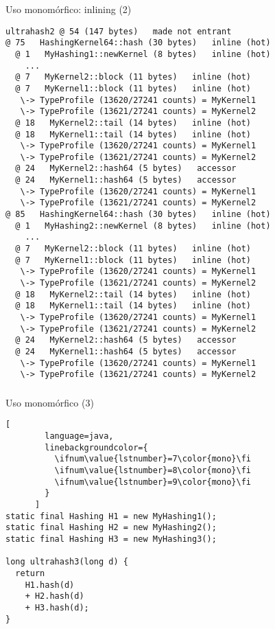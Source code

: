 \begin{frame}[fragile]
  \begin{block}{Uso monomórfico: inlining (2)}
    \begin{lstlisting}[basicstyle=\tiny]
ultrahash2 @ 54 (147 bytes)   made not entrant
@ 75   HashingKernel64::hash (30 bytes)   inline (hot)
  @ 1   MyHashing1::newKernel (8 bytes)   inline (hot)
    ...
  @ 7   MyKernel2::block (11 bytes)   inline (hot)
  @ 7   MyKernel1::block (11 bytes)   inline (hot)
   \-> TypeProfile (13620/27241 counts) = MyKernel1
   \-> TypeProfile (13621/27241 counts) = MyKernel2
  @ 18   MyKernel2::tail (14 bytes)   inline (hot)
  @ 18   MyKernel1::tail (14 bytes)   inline (hot)
   \-> TypeProfile (13620/27241 counts) = MyKernel1
   \-> TypeProfile (13621/27241 counts) = MyKernel2
  @ 24   MyKernel2::hash64 (5 bytes)   accessor
  @ 24   MyKernel1::hash64 (5 bytes)   accessor
   \-> TypeProfile (13620/27241 counts) = MyKernel1
   \-> TypeProfile (13621/27241 counts) = MyKernel2
@ 85   HashingKernel64::hash (30 bytes)   inline (hot)
  @ 1   MyHashing2::newKernel (8 bytes)   inline (hot)
    ...
  @ 7   MyKernel2::block (11 bytes)   inline (hot)
  @ 7   MyKernel1::block (11 bytes)   inline (hot)
   \-> TypeProfile (13620/27241 counts) = MyKernel1
   \-> TypeProfile (13621/27241 counts) = MyKernel2
  @ 18   MyKernel2::tail (14 bytes)   inline (hot)
  @ 18   MyKernel1::tail (14 bytes)   inline (hot)
   \-> TypeProfile (13620/27241 counts) = MyKernel1
   \-> TypeProfile (13621/27241 counts) = MyKernel2
  @ 24   MyKernel2::hash64 (5 bytes)   accessor
  @ 24   MyKernel1::hash64 (5 bytes)   accessor
   \-> TypeProfile (13620/27241 counts) = MyKernel1
   \-> TypeProfile (13621/27241 counts) = MyKernel2
    \end{lstlisting}
  \end{block}
\end{frame}


\begin{frame}[fragile]
  \frametitle{\ft}
  \begin{block}{Uso monomórfico (3)}
    \begin{lstlisting}[
        language=java,
        linebackgroundcolor={
          \ifnum\value{lstnumber}=7\color{mono}\fi
          \ifnum\value{lstnumber}=8\color{mono}\fi
          \ifnum\value{lstnumber}=9\color{mono}\fi
        }
      ]
static final Hashing H1 = new MyHashing1();
static final Hashing H2 = new MyHashing2();
static final Hashing H3 = new MyHashing3();

long ultrahash3(long d) {
  return
    H1.hash(d)
    + H2.hash(d)
    + H3.hash(d);
}
    \end{lstlisting}
  \end{block}
\end{frame}


